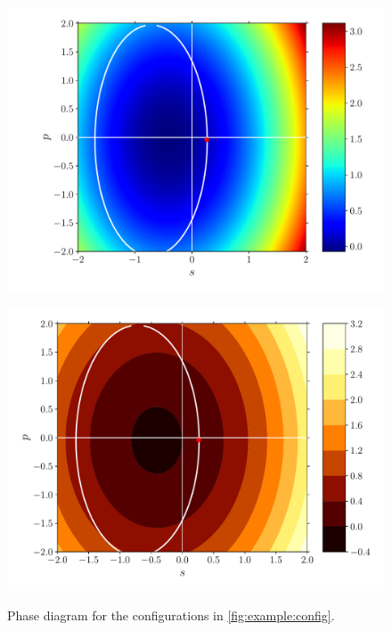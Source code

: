 \documentclass[fleqn]{goose-article}
\begin{document}
\begin{figure}[htp]
\begin{minipage}[t]{.31\textwidth}
        \includegraphics[width=\textwidth]{prestress_1_phase-diagram_energy.pdf}
        \label{fig:}
    \end{minipage}
    \hfill
    \begin{minipage}[t]{.31\textwidth}
        \centering
        \includegraphics[width=\textwidth]{prestress_1_phase-diagram_energy-contour.pdf}
        \label{fig:}
    \end{minipage}
    \caption{Phase diagram for the configurations in \cref{fig:example:config}.}
    \label{fig:example:phase-diagram}
\end{figure}
\end{document}
